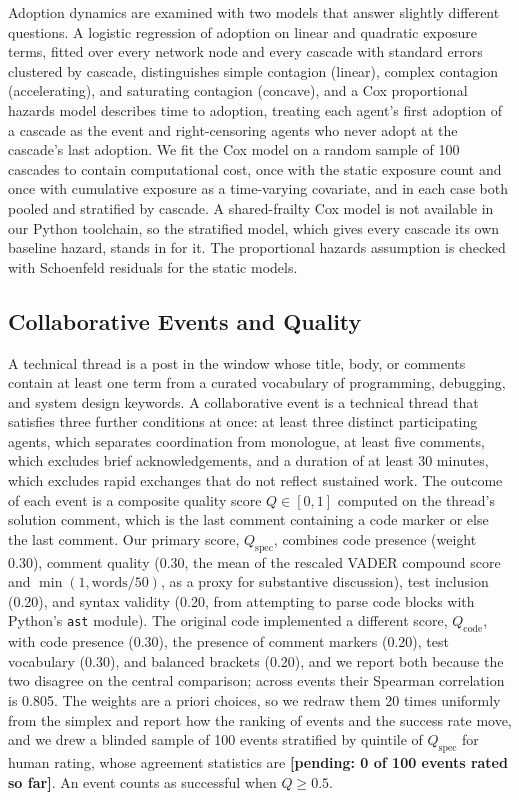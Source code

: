 \documentclass{article}
\newcommand{\tbd}[1]{\textbf{[#1]}}
\begin{document}
Adoption dynamics are examined with two models that answer slightly different questions. A logistic regression of adoption on linear and quadratic exposure terms, fitted over every network node and every cascade with standard errors clustered by cascade, distinguishes simple contagion (linear), complex contagion (accelerating), and saturating contagion (concave), and a Cox proportional hazards model describes time to adoption, treating each agent's first adoption of a cascade as the event and right-censoring agents who never adopt at the cascade's last adoption. We fit the Cox model on a random sample of 100 cascades to contain computational cost, once with the static exposure count and once with cumulative exposure as a time-varying covariate, and in each case both pooled and stratified by cascade. A shared-frailty Cox model is not available in our Python toolchain, so the stratified model, which gives every cascade its own baseline hazard, stands in for it. The proportional hazards assumption is checked with Schoenfeld residuals for the static models.

\subsection{Collaborative Events and Quality}

A technical thread is a post in the window whose title, body, or comments contain at least one term from a curated vocabulary of programming, debugging, and system design keywords. A collaborative event is a technical thread that satisfies three further conditions at once: at least three distinct participating agents, which separates coordination from monologue, at least five comments, which excludes brief acknowledgements, and a duration of at least 30 minutes, which excludes rapid exchanges that do not reflect sustained work. The outcome of each event is a composite quality score $Q \in [0,1]$ computed on the thread's solution comment, which is the last comment containing a code marker or else the last comment. Our primary score, $Q_{\text{spec}}$, combines code presence (weight 0.30), comment quality (0.30, the mean of the rescaled VADER compound score \citep{hutto2014vader} and $\min(1, \text{words}/50)$, as a proxy for substantive discussion), test inclusion (0.20), and syntax validity (0.20, from attempting to parse code blocks with Python's \texttt{ast} module). The original code implemented a different score, $Q_{\text{code}}$, with code presence (0.30), the presence of comment markers (0.20), test vocabulary (0.30), and balanced brackets (0.20), and we report both because the two disagree on the central comparison; across events their Spearman correlation is 0.805. The weights are a priori choices, so we redraw them 20 times uniformly from the simplex and report how the ranking of events and the success rate move, and we drew a blinded sample of 100 events stratified by quintile of $Q_{\text{spec}}$ for human rating, whose agreement statistics are \tbd{pending: 0 of 100 events rated so far}. An event counts as successful when $Q \geq 0.5$.
\end{document}

